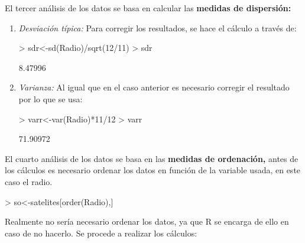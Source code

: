 \documentclass [a4paper] {article}
\begin{document}
\bigskip
El tercer an\'alisis de los datos se basa en calcular las \textbf{medidas de dispersi\'on:}
\begin{enumerate}
\item
\textit{Desviaci\'on t\'ipica: }Para corregir los resultados, se hace el c\'alculo
a trav\'es de:
\begin{Schunk}
\begin{Sinput}
> sdr<-sd(Radio)/sqrt(12/11)
> sdr
\end{Sinput}
\begin{Soutput}
[1] 8.47996
\end{Soutput}
\end{Schunk}

\item
\textit{Varianza: }Al igual que en el caso anterior es necesario corregir el 
resultado por lo que se usa:
\begin{Schunk}
\begin{Sinput}
> varr<-var(Radio)*11/12
> varr
\end{Sinput}
\begin{Soutput}
[1] 71.90972
\end{Soutput}
\end{Schunk}
\end{enumerate}

\bigskip
El cuarto an\'alisis de los datos se basa en las \textbf{medidas de ordenaci\'on,} antes de los c\'alculos es necesario ordenar
los datos en funci\'on de la variable usada, en este caso el radio.
\begin{Schunk}
\begin{Sinput}
> so<-satelites[order(Radio),]
\end{Sinput}
\end{Schunk}

\bigskip
Realmente no ser\'ia necesario ordenar los datos, ya que R se encarga de ello
en caso de no hacerlo. Se procede a realizar los c\'alculos:
\end{document}
